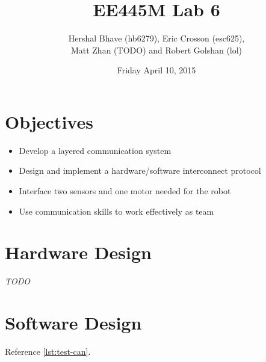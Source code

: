 \documentclass[12pt]{article}
\title{EE445M Lab 6}
\author{Hershal Bhave (hb6279), Eric Crosson (esc625), \\
  Matt Zhan (TODO) and Robert Golshan (lol)}
\date{Friday April 10, 2015}
\newcommand{\todo}{\hfill{\LARGE \emph{\color{red}TODO}}}
\begin{document}
\maketitle

\section{Objectives}

\begin{itemize}
\item Develop a layered communication system
\item Design and implement a hardware/software interconnect protocol
\item Interface two sensors and one motor needed for the robot
\item Use communication skills to work effectively as team
\end{itemize}

\section{Hardware Design}
\todo

\section{Software Design}
Reference \cref{lst:test-can}.
\end{document}
